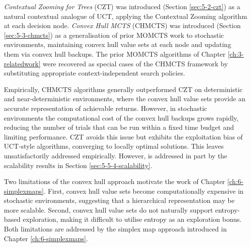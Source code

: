     \textit{Contextual Zooming for Trees} (CZT) was 
    introduced (Section \ref{sec:5-2-czt}) as a natural 
    contextual analogue of UCT, applying the Contextual 
    Zooming algorithm at each decision node. 
    \textit{Convex Hull MCTS} (CHMCTS) was introduced 
    (Section \ref{sec:5-3-chmcts}) as a generalisation 
    of prior MOMCTS work to stochastic environments, 
    maintaining convex hull value sets at each node and 
    updating them via convex hull backups. The prior 
    MOMCTS algorithms of Chapter \ref{ch:3-relatedwork} 
    were recovered as special cases of the CHMCTS 
    framework by substituting appropriate 
    context-independent search policies.

    Empirically, CHMCTS algorithms generally outperformed 
    CZT on deterministic and near-deterministic 
    environments, where the convex hull value sets 
    provide an accurate representation of achievable 
    returns. However, in stochastic environments the 
    computational cost of the convex hull backups grows 
    rapidly, reducing the number of trials that can be 
    run within a fixed time budget and limiting 
    performance. CZT avoids this issue but exhibits the 
    exploitation bias of UCT-style algorithms, converging 
    to locally optimal solutions. This leaves \stochq\ewe unsatisfactorily addressed empirically. However, \moscalabilityq\ewe is addressed in part by the scalability results in Section \ref{sec:5-5-4-scalability}.

    Two limitations of the convex hull approach motivate 
    the work of Chapter \ref{ch:6-simplexmaps}. First, 
    convex hull value sets become computationally expensive in stochastic 
    environments, suggesting that a hierarchical
    representation may be more scalable. Second,
    convex hull value sets do not naturally support entropy-based exploration, making it difficult to utilise entropy as an exploration bonus. Both 
    limitations are addressed by the simplex map 
    approach introduced in Chapter 
    \ref{ch:6-simplexmaps}.




